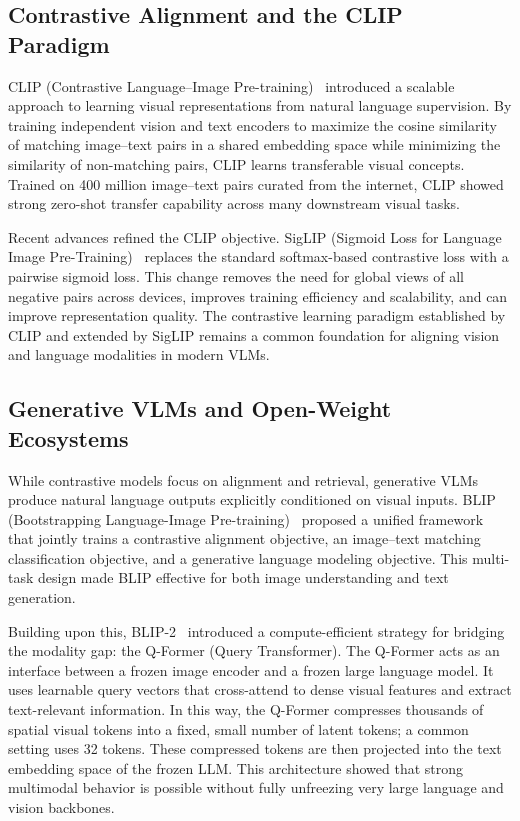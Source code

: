 \subsection{Contrastive Alignment and the CLIP Paradigm}

CLIP (Contrastive Language--Image Pre-training)~\cite{radford2021learning} introduced a scalable approach to learning visual representations from natural language supervision. By training independent vision and text encoders to maximize the cosine similarity of matching image--text pairs in a shared embedding space while minimizing the similarity of non-matching pairs, CLIP learns transferable visual concepts. Trained on 400 million image--text pairs curated from the internet, CLIP showed strong zero-shot transfer capability across many downstream visual tasks.

Recent advances refined the CLIP objective. SigLIP (Sigmoid Loss for Language Image Pre-Training)~\cite{zhai2023siglip} replaces the standard softmax-based contrastive loss with a pairwise sigmoid loss. This change removes the need for global views of all negative pairs across devices, improves training efficiency and scalability, and can improve representation quality. The contrastive learning paradigm established by CLIP and extended by SigLIP remains a common foundation for aligning vision and language modalities in modern VLMs.

\subsection{Generative VLMs and Open-Weight Ecosystems}

While contrastive models focus on alignment and retrieval, generative VLMs produce natural language outputs explicitly conditioned on visual inputs. BLIP (Bootstrapping Language-Image Pre-training)~\cite{li2022blip} proposed a unified framework that jointly trains a contrastive alignment objective, an image--text matching classification objective, and a generative language modeling objective. This multi-task design made BLIP effective for both image understanding and text generation.

Building upon this, BLIP-2~\cite{li2023blip2} introduced a compute-efficient strategy for bridging the modality gap: the Q-Former (Query Transformer). The Q-Former acts as an interface between a frozen image encoder and a frozen large language model. It uses learnable query vectors that cross-attend to dense visual features and extract text-relevant information. In this way, the Q-Former compresses thousands of spatial visual tokens into a fixed, small number of latent tokens; a common setting uses 32 tokens. These compressed tokens are then projected into the text embedding space of the frozen LLM. This architecture showed that strong multimodal behavior is possible without fully unfreezing very large language and vision backbones.

